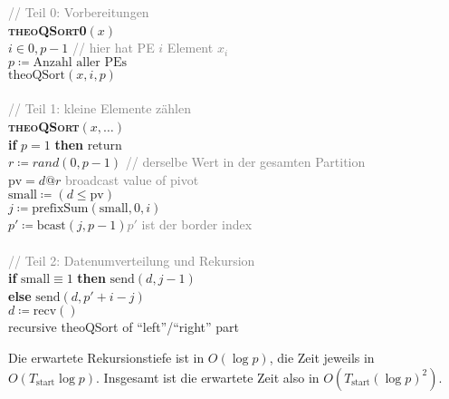 \begin{pseudocode}
  \textcolor{gray}{// Teil 0: Vorbereitungen} \\
  \textbf{\textsc{theoQSort0}}\( (x) \) \\
  \( i \in {0,p-1} \)  \enskip \textcolor{gray}{// hier hat PE \( i \) Element \( x_i \)} \\
  \( p \coloneqq \text{Anzahl aller PEs} \)\\
  \( \text{theoQSort}(x,i,p) \) \\
  \ \\
  \textcolor{gray}{// Teil 1: kleine Elemente zählen} \\
  \textbf{\textsc{theoQSort}}\( (x,\dots) \) \\
  \textbf{if} \( p = 1 \) \textbf{then} \( \text{return} \) \\
  \(r \coloneqq rand(0,p-1) \) \enskip \textcolor{gray}{// derselbe Wert in der gesamten Partition} \\
  \( \text{pv} = d@r\) \enskip \textcolor{gray}{broadcast value of pivot}\\
  \( \text{small} \coloneqq (d \leq \text{pv}) \) \\
  \( j \coloneqq \text{prefixSum}(\text{small},0,i) \) \\
  \( p' \coloneqq \text{bcast}(j,p-1) \)\enskip \textcolor{gray}{$p'$ ist der border index} \\
  \ \\
  \textcolor{gray}{// Teil 2: Datenumverteilung und Rekursion} \\
  \textbf{if} \( \text{small} \equiv 1 \) \textbf{then} \( \text{send}(d,j-1) \) \\
  \textbf{else} \( \text{send}(d,p'+i-j) \) \\
  \( d \coloneqq \text{recv}() \) \\
  recursive theoQSort of ``left''/``right'' part
\end{pseudocode}

Die erwartete Rekursionstiefe ist in \( O(\log p) \), die Zeit jeweils in \( O(T_\text{start}\log p) \). Insgesamt ist die erwartete Zeit also in \( O(T_\text{start}(\log p)^2) \).